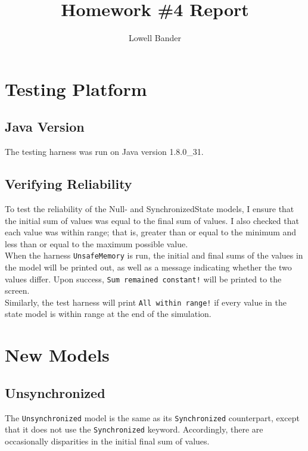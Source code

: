 \documentclass[]{article}
\begin{document}
\title{Homework \#4 Report}
\author{Lowell Bander}
\maketitle
\tableofcontents

\section{Testing Platform}
\subsection{Java Version}
The testing harness was run on Java version 1.8.0\_31.\\
\subsection{Verifying Reliability}
To test the reliability of the Null- and SynchronizedState models, I ensure that the initial sum of values was equal to the final sum of values. I also checked that each value was within range; that is, greater than or equal to the minimum and less than or equal to the maximum possible value.\\

When the harness \texttt{UnsafeMemory} is run, the initial and final sums of the values in the model will be printed out, as well as a message indicating whether the two values differ. Upon success, \texttt{Sum remained constant!} will be printed to the screen.\\

Similarly, the test harness will print \texttt{All within range!} if every value in the state model is within range at the end of the simulation.
\section{New Models}
\subsection{Unsynchronized}
The \texttt{Unsynchronized} model is the same as its \texttt{Synchronized} counterpart, except that it does not use the \texttt{Synchronized} keyword. Accordingly, there are occasionally disparities in the initial final sum of values.
\end{document}
